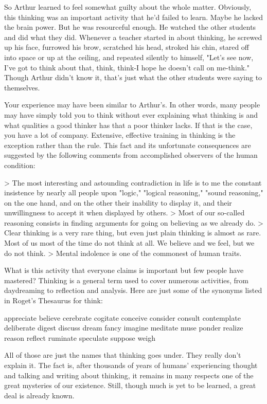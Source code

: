 \documentclass{book}
\begin{document}
So Arthur learned to feel somewhat guilty about the whole matter. Obviously, this thinking was an important activity that he’d failed to learn. Maybe he lacked the brain power. But he was resourceful enough. He watched the other students and did what they did. Whenever a teacher started in about thinking, he screwed up his face, furrowed his brow, scratched his head, stroked his chin, stared off into space or up at the ceiling, and repeated silently to himself, "Let’s see now, I’ve got to think about that, think, think-I hope he doesn’t call on me-think." Though Arthur didn’t know it, that’s just what the other students were saying to themselves.

Your experience may have been similar to Arthur’s. In other words, many people may have simply told you to think without ever explaining what thinking is and what qualities a good thinker has that a poor thinker lacks. If that is the case, you have a lot of company. Extensive, effective training in thinking is the exception rather than the rule. This fact and its unfortunate consequences are suggested by the following comments from accomplished observers of the human condition:

> The most interesting and astounding contradiction in life is to me the constant insistence by nearly all people upon "logic," "logical reasoning," "sound reasoning," on the one hand, and on the other their inability to display it, and their unwillingness to accept it when displayed by others.
> Most of our so-called reasoning consists in finding arguments for going on believing as we already do.
> Clear thinking is a very rare thing, but even just plain thinking is almost as rare. Most of us most of the time do not think at all. We believe and we feel, but we do not think.
> Mental indolence is one of the commonest of human traits.

What is this activity that everyone claims is important but few people have mastered? Thinking is a general term used to cover numerous activities, from daydreaming to reflection and analysis. Here are just some of the synonyms listed in Roget’s Thesaurus for think:

appreciate believe cerebrate cogitate conceive consider
consult contemplate deliberate digest discuss dream
fancy imagine meditate muse ponder realize
reason reflect ruminate speculate suppose weigh

All of those are just the names that thinking goes under. They really don’t explain it. The fact is, after thousands of years of humans’ experiencing thought and talking and writing about thinking, it remains in many respects one of the great mysteries of our existence. Still, though much is yet to be learned, a great deal is already known.
\end{document}
